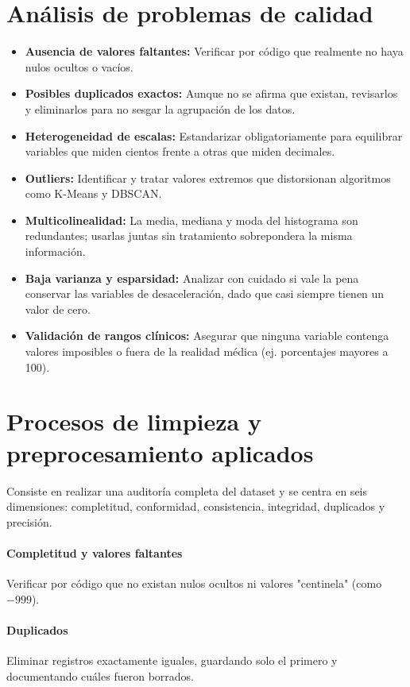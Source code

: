 \documentclass[12pt,letterpaper]{article}
\begin{document}
\section{Análisis de problemas de calidad}
\begin{itemize}
    \item \textbf{Ausencia de valores faltantes:} Verificar por código que realmente no haya nulos ocultos o vacíos.
    \item \textbf{Posibles duplicados exactos:} Aunque no se afirma que existan, revisarlos y eliminarlos para no sesgar la agrupación de los datos.
    \item \textbf{Heterogeneidad de escalas:} Estandarizar obligatoriamente para equilibrar variables que miden cientos frente a otras que miden decimales.
    \item \textbf{Outliers:} Identificar y tratar valores extremos que distorsionan algoritmos como K-Means y DBSCAN.
    \item \textbf{Multicolinealidad:} La media, mediana y moda del histograma son redundantes; usarlas juntas sin tratamiento sobrepondera la misma información.
    \item \textbf{Baja varianza y esparsidad:} Analizar con cuidado si vale la pena conservar las variables de desaceleración, dado que casi siempre tienen un valor de cero.
    \item \textbf{Validación de rangos clínicos:} Asegurar que ninguna variable contenga valores imposibles o fuera de la realidad médica (ej. porcentajes mayores a 100).
\end{itemize}

\section{Procesos de limpieza y preprocesamiento aplicados}

Consiste en realizar una auditoría completa del dataset y se centra en seis dimensiones: completitud, conformidad, consistencia, integridad, duplicados y precisión.

\paragraph{Completitud y valores faltantes}
 Verificar por código que no existan nulos ocultos ni valores "centinela" (como $-999$).

\paragraph{Duplicados}
Eliminar registros exactamente iguales, guardando solo el primero y documentando cuáles fueron borrados.
\end{document}
